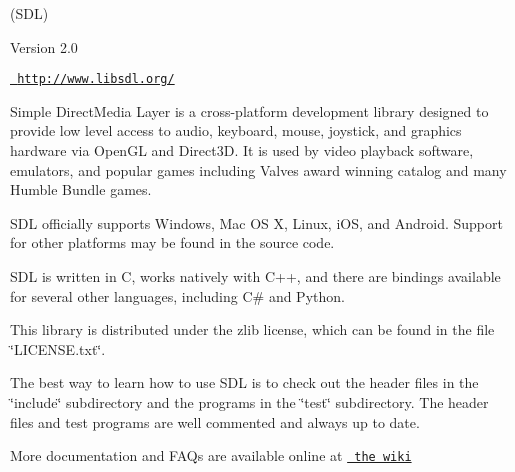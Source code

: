 \label{index_mainpage}%
%
 \begin{DoxyVerb}                              (SDL)

                            Version 2.0
\end{DoxyVerb}
 \href{http://www.libsdl.org/}{\texttt{ http\+://www.\+libsdl.\+org/}}

Simple Direct\+Media Layer is a cross-\/platform development library designed to provide low level access to audio, keyboard, mouse, joystick, and graphics hardware via Open\+GL and Direct3D. It is used by video playback software, emulators, and popular games including Valve\textquotesingle{}s award winning catalog and many Humble Bundle games.

SDL officially supports Windows, Mac OS X, Linux, i\+OS, and Android. Support for other platforms may be found in the source code.

SDL is written in C, works natively with C++, and there are bindings available for several other languages, including C\# and Python.

This library is distributed under the zlib license, which can be found in the file \char`\"{}\+LICENSE.\+txt\char`\"{}.

The best way to learn how to use SDL is to check out the header files in the \char`\"{}include\char`\"{} subdirectory and the programs in the \char`\"{}test\char`\"{} subdirectory. The header files and test programs are well commented and always up to date.

More documentation and FAQs are available online at \href{http://wiki.libsdl.org/}{\texttt{ the wiki}}


